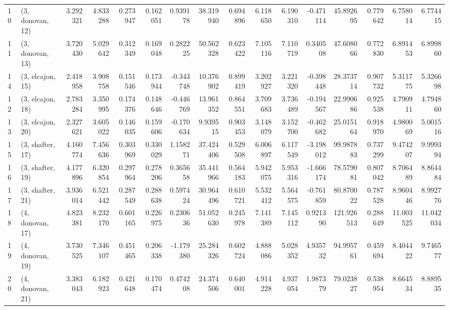 \begin{tabular}{llrrrrrrrrrrrrrr}
10 &  (3, donovan, 12) &  3.292321 &   4.833288 &   0.273947 &  0.162051 &  0.939178 &  38.319940 &  0.694896 &   6.118650 &  6.190310 & -0.471114 &   45.892695 &  0.779642 &   6.758014 &   6.774415 \\
11 &  (3, donovan, 13) &  3.720430 &   5.029642 &   0.312349 &  0.169048 &  0.282225 &  50.562328 &  0.623422 &   7.105116 &  7.110719 &  0.340508 &   47.608066 &  0.772830 &   6.891453 &   6.899860 \\
14 &  (3, elcajon, 15) &  2.418958 &   3.908758 &   0.151546 &  0.173944 & -0.343748 &  10.376902 &  0.899419 &   3.202927 &  3.221320 & -0.398448 &   28.373714 &  0.907732 &   5.311775 &   5.326698 \\
12 &  (3, elcajon, 18) &  2.783284 &   3.350995 &   0.174376 &  0.148646 & -0.446769 &  13.961352 &  0.864551 &   3.709683 &  3.736489 & -0.194567 &   22.990686 &  0.925538 &   4.790911 &   4.794860 \\
13 &  (3, elcajon, 20) &  2.327621 &   3.605022 &   0.146035 &  0.159606 & -0.170634 &   9.939515 &  0.903453 &   3.148079 &  3.152700 & -0.462682 &   25.015164 &  0.918970 &   4.980069 &   5.001516 \\
15 &  (3, shafter, 17) &  4.160774 &   7.456636 &   0.303969 &  0.330029 &  1.158271 &  37.424406 &  0.529508 &   6.006897 &  6.117549 & -3.198012 &   99.987883 &  0.737299 &   9.474207 &   9.999394 \\
16 &  (3, shafter, 19) &  4.177896 &   6.320854 &   0.297964 &  0.278206 &  0.365658 &  35.441966 &  0.564183 &   5.942075 &  5.953316 & -1.666174 &   78.579081 &  0.807042 &   8.706489 &   8.864484 \\
17 &  (3, shafter, 21) &  3.936014 &   6.521442 &   0.287549 &  0.288638 &  0.597424 &  30.964496 &  0.610721 &   5.532412 &  5.564575 & -0.761859 &   80.870022 &  0.787528 &   8.960446 &   8.992776 \\
18 &  (4, donovan, 17) &  4.823381 &   8.232170 &   0.601165 &  0.226975 &  0.230636 &  51.052630 &  0.245978 &   7.141389 &  7.145112 &  0.921390 &  121.926513 &  0.288649 &  11.003525 &  11.042034 \\
19 &  (4, donovan, 19) &  3.730525 &   7.346107 &   0.451465 &  0.206338 & -1.179380 &  25.284326 &  0.602724 &   4.888086 &  5.028352 &  4.935732 &   94.995761 &  0.459694 &   8.404422 &   9.746577 \\
20 &  (4, donovan, 21) &  3.383043 &   6.182923 &   0.421648 &  0.170474 &  0.474208 &  24.374506 &  0.640001 &   4.914228 &  4.937054 &  1.987379 &   79.023827 &  0.538954 &   8.664534 &   8.889535 \\

\end{tabular}
